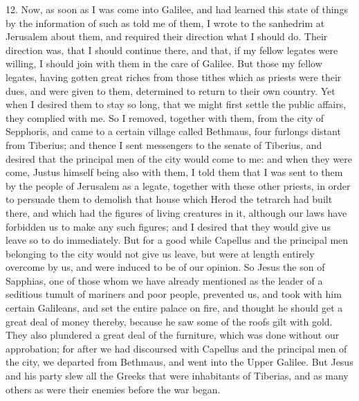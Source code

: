12. Now, as soon as I was come into Galilee, and had learned this state of
things by the information of such as told me of them, I wrote to the
sanhedrim at Jerusalem about them, and required their direction what I
should do. Their direction was, that I should continue there, and that, if
my fellow legates were willing, I should join with them in the care of
Galilee. But those my fellow legates, having gotten great riches from
those tithes which as priests were their dues, and were given to them,
determined to return to their own country. Yet when I desired them to stay
so long, that we might first settle the public affairs, they complied with
me. So I removed, together with them, from the city of Sepphoris, and came
to a certain village called Bethmaus, four furlongs distant from Tiberius;
and thence I sent messengers to the senate of Tiberius, and desired that
the principal men of the city would come to me: and when they were come,
Justus himself being also with them, I told them that I was sent to them
by the people of Jerusalem as a legate, together with these other priests,
in order to persuade them to demolish that house which Herod the tetrarch
had built there, and which had the figures of living creatures in it,
although our laws have forbidden us to make any such figures; and I
desired that they would give us leave so to do immediately. But for a good
while Capellus and the principal men belonging to the city would not give
us leave, but were at length entirely overcome by us, and were induced to
be of our opinion. So Jesus the son of Sapphias, one of those whom we have
already mentioned as the leader of a seditious tumult of mariners and poor
people, prevented us, and took with him certain Galileans, and set the
entire palace on fire, and thought he should get a great deal of money
thereby, because he saw some of the roofs gilt with gold. They also
plundered a great deal of the furniture, which was done without our
approbation; for after we had discoursed with Capellus and the principal
men of the city, we departed from Bethmaus, and went into the Upper
Galilee. But Jesus and his party slew all the Greeks that were inhabitants
of Tiberias, and as many others as were their enemies before the war
began.

